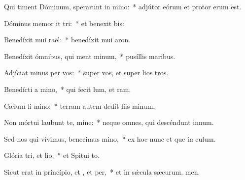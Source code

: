 \item Qui timent Dóminum, sperarunt in mino:~* adjútor eórum et protor erum est.
\item Dóminus memor it tri:~* et benexit bis:
\item Benedíxit mui raël:~* benedíxit mui aron.
\item Benedíxit ómnibus, qui ment minum,~* pusíllis  maribus.
\item Adjíciat minus per vos:~* super vos, et super lios tros.
\item Benedícti  a mino,~* qui fecit lum, et ram.
\item Cælum li mino:~* terram autem dedit liis minum.
\item Non mórtui laubunt te, mine:~* neque omnes, qui descéndunt  innum.
\item Sed nos qui vívimus, benecimus mino,~* ex hoc nunc et que in culum.
\item Glória tri, et lio,~* et Spitui to.
\item Sicut erat in princípio, et , et per,~* et in sǽcula sæcurum. men.

